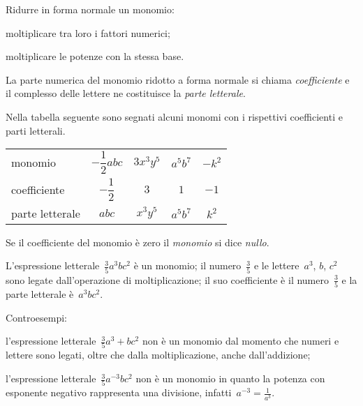 \begin{procedura}
 Ridurre in forma normale un monomio:
 \begin{enumeratea}
 \item moltiplicare tra loro i fattori numerici;
 \item moltiplicare le potenze con la stessa base.
 \end{enumeratea}
\end{procedura}

\ovalbox{\risolvi \ref{ese:9.2}}

\begin{definizione}
La parte numerica del monomio ridotto a forma normale si chiama \emph{coefficiente} e
il complesso delle lettere ne costituisce la \emph{parte letterale}.
\end{definizione}

\begin{exrig}
 \begin{esempio}
 Nella tabella seguente sono segnati alcuni monomi con i rispettivi coefficienti e parti letterali.
\begin{center}
 \begin{tabular}{lcccc}
 \toprule
 monomio & $-{\dfrac{1}{2}}abc$ & $3x^{3}y^{5}$ & $a^{5}b^{7}$ & $-k^{2}$\\
coefficiente & $-{\dfrac{1}{2}}$ & $3$ & $1$ & $-1$ \\
parte letterale & $abc$ & $x^{3}y^{5}$ & $a^{5}b^{7}$ & $k^{2}$ \\
 \bottomrule
\end{tabular}
\end{center}
 \end{esempio}
\end{exrig}

\begin{definizione}
Se il coefficiente del monomio è zero il \emph{monomio} si dice \emph{nullo}.
\end{definizione}

\begin{exrig}
 \begin{esempio}
L'espressione letterale~$\frac{3}{5}a^{3}bc^{2}$ è un monomio;
il numero~$\frac{3}{5}$ e le lettere~$a^{3}$, $b$, $c^{2}$ sono legate
dall'operazione di moltiplicazione; il suo coefficiente è il numero~$\frac{3}{5}$ e la parte letterale è~$a^{3}bc^{2}$.
 \end{esempio}

 \begin{esempio}
 Controesempi:

 \begin{enumeratea}
 \item l'espressione letterale~$\frac{3}{5}a^{3}+bc^{2}$
 non è un monomio dal momento che numeri e lettere sono legati, oltre
che dalla moltiplicazione, anche dall'addizione;
\item l'espressione letterale~$\frac{3}{5}a^{-3}bc^{2}$
non è un monomio in quanto la potenza con esponente negativo
rappresenta una divisione, infatti~$a^{-3}=\frac{1}{a^{3}}$.
\end{enumeratea}
 \end{esempio}
\end{exrig}

